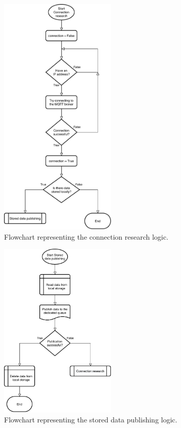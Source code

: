 \begin{figure}[h]
\centering 
\includegraphics[width=0.5\textwidth]{images/flowconnection} 
\caption{Flowchart representing the connection research logic.}
\label{fig:flowconnection}
\end{figure}

\begin{figure}[h]
\centering 
\includegraphics[width=0.5\textwidth]{images/flowstorage} 
\caption{Flowchart representing the stored data publishing logic.}
\label{fig:flowstorage}
\end{figure}

